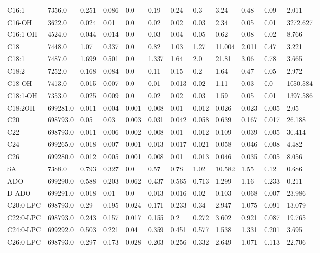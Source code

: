 \begin{tabular}{llllllllllll}
C16:1 & 7356.0 & 0.251 & 0.086 & 0.0 & 0.19 & 0.24 & 0.3 & 3.24 & 0.48 & 0.09 & 2.011 \\
C16-OH & 3622.0 & 0.024 & 0.01 & 0.0 & 0.02 & 0.02 & 0.03 & 2.34 & 0.05 & 0.01 & 3272.627 \\
C16:1-OH & 4524.0 & 0.044 & 0.014 & 0.0 & 0.03 & 0.04 & 0.05 & 0.62 & 0.08 & 0.02 & 8.766 \\
C18 & 7448.0 & 1.07 & 0.337 & 0.0 & 0.82 & 1.03 & 1.27 & 11.004 & 2.011 & 0.47 & 3.221 \\
C18:1 & 7487.0 & 1.699 & 0.501 & 0.0 & 1.337 & 1.64 & 2.0 & 21.81 & 3.06 & 0.78 & 3.665 \\
C18:2 & 7252.0 & 0.168 & 0.084 & 0.0 & 0.11 & 0.15 & 0.2 & 1.64 & 0.47 & 0.05 & 2.972 \\
C18-OH & 7413.0 & 0.015 & 0.007 & 0.0 & 0.01 & 0.013 & 0.02 & 1.11 & 0.03 & 0.0 & 1050.584 \\
C18:1-OH & 7353.0 & 0.025 & 0.009 & 0.0 & 0.02 & 0.02 & 0.03 & 1.59 & 0.05 & 0.01 & 1397.586 \\
C18:2OH & 699281.0 & 0.011 & 0.004 & 0.001 & 0.008 & 0.01 & 0.012 & 0.026 & 0.023 & 0.005 & 2.05 \\
C20 & 698793.0 & 0.05 & 0.03 & 0.003 & 0.031 & 0.042 & 0.058 & 0.639 & 0.167 & 0.017 & 26.188 \\
C22 & 698793.0 & 0.011 & 0.006 & 0.002 & 0.008 & 0.01 & 0.012 & 0.109 & 0.039 & 0.005 & 30.414 \\
C24 & 699265.0 & 0.018 & 0.007 & 0.001 & 0.013 & 0.017 & 0.021 & 0.058 & 0.046 & 0.008 & 4.482 \\
C26 & 699280.0 & 0.012 & 0.005 & 0.001 & 0.008 & 0.01 & 0.013 & 0.046 & 0.035 & 0.005 & 8.056 \\
SA & 7388.0 & 0.793 & 0.327 & 0.0 & 0.57 & 0.78 & 1.02 & 10.582 & 1.55 & 0.12 & 0.686 \\
ADO & 699290.0 & 0.588 & 0.203 & 0.062 & 0.437 & 0.565 & 0.713 & 1.299 & 1.16 & 0.233 & 0.211 \\
D-ADO & 699291.0 & 0.018 & 0.01 & 0.0 & 0.013 & 0.016 & 0.02 & 0.103 & 0.068 & 0.007 & 23.986 \\
C20:0-LPC & 698793.0 & 0.29 & 0.195 & 0.024 & 0.171 & 0.233 & 0.34 & 2.947 & 1.075 & 0.091 & 13.079 \\
C22:0-LPC & 698793.0 & 0.243 & 0.157 & 0.017 & 0.155 & 0.2 & 0.272 & 3.602 & 0.921 & 0.087 & 19.765 \\
C24:0-LPC & 699292.0 & 0.503 & 0.221 & 0.04 & 0.359 & 0.451 & 0.577 & 1.538 & 1.331 & 0.201 & 3.695 \\
C26:0-LPC & 698793.0 & 0.297 & 0.173 & 0.028 & 0.203 & 0.256 & 0.332 & 2.649 & 1.071 & 0.113 & 22.706 \\

\end{tabular}
